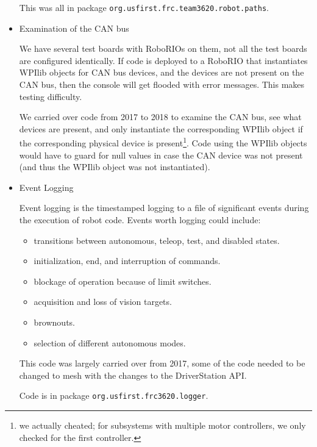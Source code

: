 \documentclass[]{article}
\begin{document}
\begin{itemize}[topsep=0pt]
This was all in package \texttt{org.usfirst.frc.team3620.robot.paths}.

\item Examination of the CAN bus

We have several test boards with RoboRIOs on them, not all the test boards are configured identically. If code is deployed to a RoboRIO that instantiates WPIlib objects for CAN bus devices, and the devices are not present on the CAN bus, then the console will get flooded with error messages. This makes testing difficulty.

We carried over code from 2017 to 2018 to examine the CAN bus, see what devices are present, and only instantiate the corresponding WPIlib object if the corresponding physical device is present\footnote {
	we actually cheated; for subsystems with multiple motor controllers, we only checked for the first controller.}. Code using the WPIlib objects would have to guard for null values in case the CAN device was not present (and thus the WPIlib object was not instantiated).

\item Event Logging

Event logging is the timestamped logging to a file of significant events during the execution of robot code.
Events worth logging could include:
\begin{itemize}[noitemsep,topsep=0pt]
\item transitions between autonomous, teleop, test, and disabled states.
\item initialization, end, and interruption of commands.
\item blockage of operation because of limit switches.
\item acquisition and loss of vision targets.
\item brownouts.
\item selection of different autonomous modes.
\end{itemize}

This code was largely carried over from 2017, some of the code needed to be changed to mesh with the changes to the DriverStation API.

Code is in package \texttt{org.usfirst.frc3620.logger}.


\end{itemize}
\end{document}
